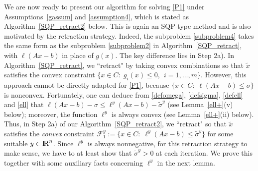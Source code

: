 \documentclass[10pt]{article}
\numberwithin{equation}{section}
\def\R{{\rm I\!R}}
\begin{document}
We are now ready to present our algorithm for solving \eqref{P1} under Assumptions~\ref{gassum} and \ref{assumption4}, which is stated as Algorithm~\ref{SQP_retract2} below. This is again an SQP-type method and is also motivated by the retraction strategy. Indeed, the subproblem \eqref{subproblem4} takes the same form as the subproblem \eqref{subproblem2} in Algorithm~\ref{SQP_retract}, with $\ell(Ax - b)$ in place of $g(x)$. The key difference lies in Step 2a). In Algorithm~\ref{SQP_retract}, we ``retract" by taking convex combinations so that $\widetilde x$ satisfies the convex constraint $\{x\in C:\; g_i(x) \le 0,\ \ i = 1,\ldots,m\}$. However, this approach cannot be directly adapted for \eqref{P1}, because $\{x\in C:\; \ell(Ax - b)\le \sigma\}$ is nonconvex. Fortunately, one can deduce from \eqref{defomega}, \eqref{defsigma}, \eqref{defell} and \eqref{ell} that $\ell(Ax - b) - \sigma \le \ell^y(Ax - b) - \widetilde{\sigma}^y$ (see Lemma~\ref{ell+}(v) below); moreover, the function $\ell^y$ is always convex (see Lemma~\ref{ell+}(ii) below). Thus, in Step 2a) of our Algorithm~\ref{SQP_retract2}, we ``retract" so that $\widetilde x$ satisfies the \emph{convex} constraint $\mathcal{F}_1^{y} := \{x\in C:\; \ell^y(Ax - b)\le \widetilde\sigma^y\}$ for some suitable $y \in \R^n$. Since $\ell^y$ is always nonnegative, for this retraction strategy to make sense, we have to at least show that $\widetilde\sigma^y > 0$ at each iteration. We prove this together with some auxiliary facts concerning $\ell^y$ in the next lemma.
\end{document}
